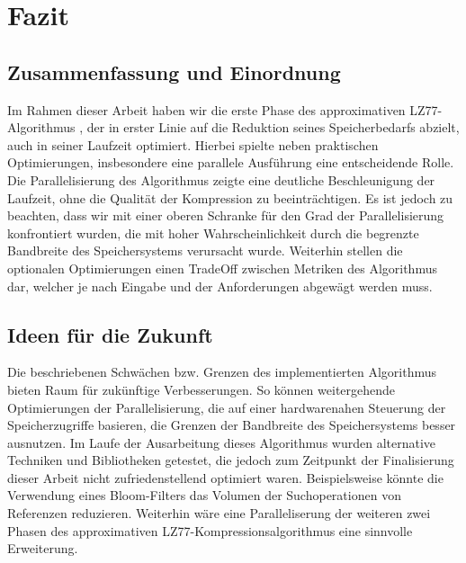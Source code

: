 \chapter{Fazit}
\section{Zusammenfassung und Einordnung}
Im Rahmen dieser Arbeit haben wir die erste Phase des approximativen LZ77-Algorithmus \cite{ApproxLZ77}, der in erster Linie auf die Reduktion
seines Speicherbedarfs abzielt, auch in seiner Laufzeit optimiert. Hierbei spielte neben praktischen Optimierungen, insbesondere eine 
parallele Ausführung eine entscheidende Rolle. Die Parallelisierung des Algorithmus zeigte eine deutliche Beschleunigung der Laufzeit, ohne
die Qualität der Kompression zu beeinträchtigen. Es ist jedoch zu beachten, dass wir mit einer oberen Schranke für den Grad der Parallelisierung
konfrontiert wurden, die mit hoher Wahrscheinlichkeit durch die begrenzte Bandbreite des Speichersystems verursacht wurde. Weiterhin
stellen die optionalen Optimierungen einen TradeOff zwischen Metriken des Algorithmus dar, welcher je nach Eingabe und der Anforderungen
abgewägt werden muss.

\section{Ideen für die Zukunft}
Die beschriebenen Schwächen bzw. Grenzen des implementierten Algorithmus bieten Raum für zukünftige Verbesserungen. So können weitergehende
Optimierungen der Parallelisierung, die auf einer hardwarenahen Steuerung der Speicherzugriffe basieren, die Grenzen der Bandbreite des Speichersystems
besser ausnutzen. Im Laufe der Ausarbeitung dieses Algorithmus wurden alternative Techniken und Bibliotheken getestet, die jedoch zum Zeitpunkt
der Finalisierung dieser Arbeit nicht zufriedenstellend optimiert waren. Beispielsweise könnte die Verwendung eines Bloom-Filters \cite{bloom} das Volumen
der Suchoperationen von Referenzen reduzieren. Weiterhin wäre eine Paralleliserung der weiteren zwei Phasen des approximativen LZ77-Kompressionsalgorithmus
\cite{ApproxLZ77} eine sinnvolle Erweiterung.